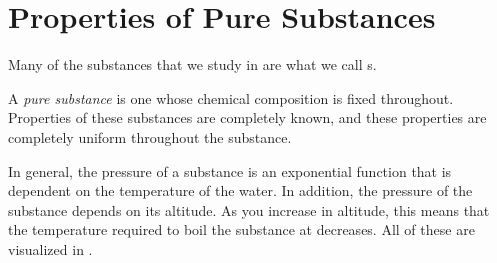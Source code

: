 \section{Properties of Pure Substances}\label{sec:Properties_Pure_Substances}
Many of the substances that we study in  are what we call s.

\begin{definition}\label{def:Pure_Substance}
  A \emph{pure substance} is one whose chemical composition is fixed throughout.
  Properties of these substances are completely known, and these properties are completely uniform throughout the substance.
\end{definition}

In general, the pressure of a substance is an exponential function that is dependent on the temperature of the water.
In addition, the pressure of the substance depends on its altitude.
As you increase in altitude, this means that the temperature required to boil the substance at decreases.
All of these are visualized in .



